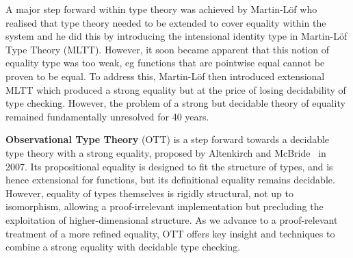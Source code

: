 \documentclass[a4paper,11pt]{article}
\begin{document}
A major step forward within type theory was achieved by Martin-L\"of
who realised that type theory needed to be extended to cover equality
within the system and he did this by introducing the intensional
identity type in Martin-L\"of Type Theory (MLTT).
However, it soon became apparent that this notion of equality type was
too weak, eg functions that are pointwise equal cannot be proven to
be equal. To address this, Martin-L\"of then introduced extensional
MLTT which produced a strong equality but at the price of
losing decidability of type checking. However, the problem of a strong but
decidable theory of equality remained fundamentally unresolved for 40
years. 


{\bf Observational Type Theory} (OTT) is a step forward towards a
decidable type theory with a strong equality, proposed by
Altenkirch and McBride~\cite{alti:ott-conf} in 2007. Its propositional equality is designed
to fit the structure of types, and is hence extensional for functions,
but its definitional equality remains decidable. However, equality of
types themselves is rigidly structural, not up to isomorphism,
allowing a proof-irrelevant implementation but precluding the
exploitation of higher-dimensional structure. As we advance to a
proof-relevant treatment of a more refined equality, OTT offers key
insight and techniques to combine a strong equality with decidable
type checking.



\end{document}
